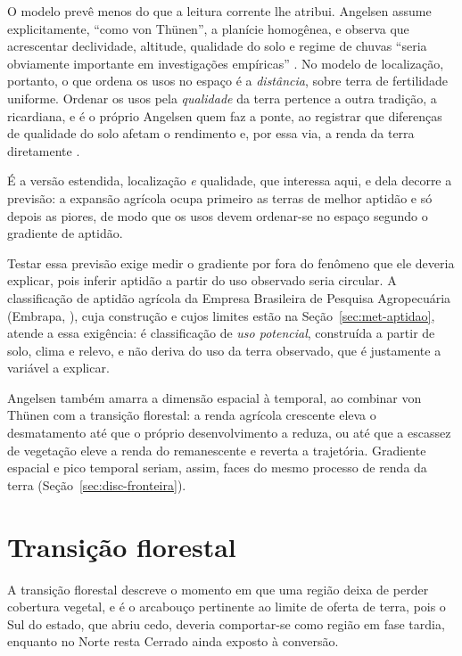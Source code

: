 O modelo prevê menos do que a leitura corrente lhe atribui. Angelsen assume
explicitamente, ``como von Thünen'', a planície homogênea, e observa que
acrescentar declividade, altitude, qualidade do solo e regime de chuvas
``seria obviamente importante em investigações empíricas''
\cite[p.~5, tradução nossa]{Angelsen2007}. No modelo de localização, portanto,
o que ordena os usos no espaço é a \emph{distância}, sobre terra de
fertilidade uniforme. Ordenar os usos pela \emph{qualidade} da terra pertence
a outra tradição, a ricardiana, e é o próprio Angelsen quem faz a ponte, ao
registrar que diferenças de qualidade do solo afetam o rendimento e, por essa
via, a renda da terra diretamente \cite[p.~6]{Angelsen2007}.

É a versão estendida, localização \emph{e} qualidade, que interessa
aqui, e dela decorre a previsão: a expansão agrícola ocupa primeiro as terras
de melhor aptidão e só depois as piores, de modo que os usos devem
ordenar-se no espaço segundo o gradiente de aptidão.

Testar essa previsão exige medir o gradiente por fora do fenômeno que ele
deveria explicar, pois inferir aptidão a partir do uso observado seria
circular. A classificação de aptidão agrícola da Empresa Brasileira de
Pesquisa Agropecuária (Embrapa, \citeyear{Embrapa_Aptidao}), cuja construção
e cujos limites estão na Seção~\ref{sec:met-aptidao}, atende a essa
exigência: é
classificação de \emph{uso potencial}, construída a partir de solo, clima e
relevo, e não deriva do uso da terra observado, que é justamente a variável a
explicar.

Angelsen também amarra a dimensão espacial à temporal, ao combinar von Thünen
com a transição florestal: a renda agrícola crescente eleva o desmatamento até
que o próprio desenvolvimento a reduza, ou até que a escassez de vegetação
eleve a renda do remanescente e reverta a trajetória. Gradiente espacial e
pico temporal seriam, assim, faces do mesmo processo de renda da terra
(Seção~\ref{sec:disc-fronteira}).

\section{Transição florestal}
\label{sec:ref-transicao}

A transição florestal descreve o momento em que uma região deixa de perder
cobertura vegetal, e é o arcabouço pertinente ao limite de oferta de terra, pois o
Sul do estado, que abriu cedo, deveria comportar-se como região em fase
tardia, enquanto no Norte resta Cerrado ainda exposto à conversão.

